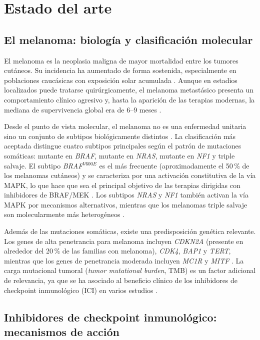 \chapter{Estado del arte}

\section{El melanoma: biología y clasificación molecular}

El melanoma es la neoplasia maligna de mayor mortalidad entre los tumores cutáneos. Su incidencia ha aumentado de forma sostenida, especialmente en poblaciones caucásicas con exposición solar acumulada \cite{Potrony2015}. Aunque en estadios localizados puede tratarse quirúrgicamente, el melanoma metastásico presenta un comportamiento clínico agresivo y, hasta la aparición de las terapias modernas, la mediana de supervivencia global era de 6--9 meses \cite{Lebbe2014}.

Desde el punto de vista molecular, el melanoma no es una enfermedad unitaria sino un conjunto de subtipos biológicamente distintos \cite{Bastian2014}. La clasificación más aceptada distingue cuatro subtipos principales según el patrón de mutaciones somáticas: mutante en \textit{BRAF}, mutante en \textit{NRAS}, mutante en \textit{NF1} y triple salvaje. El subtipo \textit{BRAF}$^{V600E}$ es el más frecuente (aproximadamente el 50\,\% de los melanomas cutáneos) y se caracteriza por una activación constitutiva de la vía MAPK, lo que hace que sea el principal objetivo de las terapias dirigidas con inhibidores de BRAF/MEK \cite{Bastian2014, Switzer2022}. Los subtipos \textit{NRAS} y \textit{NF1} también activan la vía MAPK por mecanismos alternativos, mientras que los melanomas triple salvaje son molecularmente más heterogéneos \cite{Podlipnik2021}.

Además de las mutaciones somáticas, existe una predisposición genética relevante. Los genes de alta penetrancia para melanoma incluyen \textit{CDKN2A} (presente en alrededor del 20\,\% de las familias con melanoma), \textit{CDK4}, \textit{BAP1} y \textit{TERT}, mientras que los genes de penetrancia moderada incluyen \textit{MC1R} y \textit{MITF} \cite{Potrony2015}. La carga mutacional tumoral (\textit{tumor mutational burden}, TMB) es un factor adicional de relevancia, ya que se ha asociado al beneficio clínico de los inhibidores de checkpoint inmunológico (ICI) en varios estudios \cite{Podlipnik2021}.

\section{Inhibidores de checkpoint inmunológico: mecanismos de acción}

